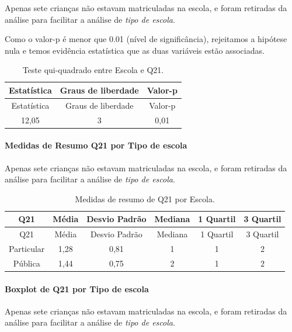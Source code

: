 \documentclass[]{article}
\let\oldparagraph\paragraph
\renewcommand{\paragraph}[1]{\oldparagraph{#1}\mbox{}}
\begin{document}
Apenas sete crianças não estavam matriculadas na escola, e foram retiradas da análise para facilitar a análise de \emph{tipo de escola}.

Como o valor-p é menor que 0.01 (nível de significância), rejeitamos a hipótese nula e temos evidência estatística que as duas variáveis estão associadas.

\begin{longtable}[]{@{}ccc@{}}
\caption{\label{tab:unnamed-chunk-468}Teste qui-quadrado entre Escola e Q21.}\tabularnewline
\toprule
Estatística & Graus de liberdade & Valor-p\tabularnewline
\midrule
\endfirsthead
\toprule
Estatística & Graus de liberdade & Valor-p\tabularnewline
\midrule
\endhead
12,05 & 3 & 0,01\tabularnewline
\bottomrule
\end{longtable}

\cleardoublepage

\hypertarget{medidas-de-resumo-q21-por-tipo-de-escola}{%
\paragraph{Medidas de Resumo Q21 por Tipo de escola}\label{medidas-de-resumo-q21-por-tipo-de-escola}}

Apenas sete crianças não estavam matriculadas na escola, e foram retiradas da análise para facilitar a análise de \emph{tipo de escola}.

\begin{longtable}[]{@{}cccccc@{}}
\caption{\label{tab:unnamed-chunk-469}Medidas de resumo de Q21 por Escola.}\tabularnewline
\toprule
Q21 & Média & Desvio Padrão & Mediana & 1 Quartil & 3 Quartil\tabularnewline
\midrule
\endfirsthead
\toprule
Q21 & Média & Desvio Padrão & Mediana & 1 Quartil & 3 Quartil\tabularnewline
\midrule
\endhead
Particular & 1,28 & 0,81 & 1 & 1 & 2\tabularnewline
Pública & 1,44 & 0,75 & 2 & 1 & 2\tabularnewline
\bottomrule
\end{longtable}

\hypertarget{boxplot-de-q21-por-tipo-de-escola}{%
\paragraph{Boxplot de Q21 por Tipo de escola}\label{boxplot-de-q21-por-tipo-de-escola}}

Apenas sete crianças não estavam matriculadas na escola, e foram retiradas da análise para facilitar a análise de \emph{tipo de escola}.
\end{document}
